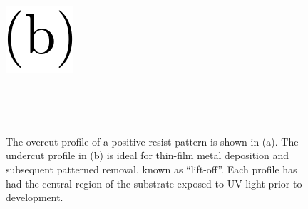 \documentclass[
  a4paper,
]{scrbook}
\begin{document}
\begin{figure}
\begin{minipage}[t]{0.03\linewidth}
{{\includegraphics{figures/(b).png}

}

}

\end{minipage}%
%
\begin{minipage}[t]{0.01\linewidth}

{\centering 

~

}

\end{minipage}%
%
\begin{minipage}[t]{0.45\linewidth}

{\centering 


}

\end{minipage}%
%
\begin{minipage}[t]{0.01\linewidth}

{\centering 

~

}

\end{minipage}%

\caption{\label{fig-photolithography-profiles}The overcut profile of a
positive resist pattern is shown in (a). The undercut profile in (b) is
ideal for thin-film metal deposition and subsequent patterned removal,
known as ``lift-off''. Each profile has had the central region of the
substrate exposed to UV light prior to development.}

\end{figure}
\end{document}
